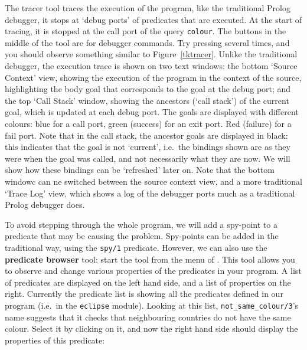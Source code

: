 The tracer tool traces the execution of the program, like the traditional
Prolog debugger, it stops at  `debug ports' of predicates that are
executed.
At the start of tracing,
it is stopped at the call port of the query \verb'colour'. The buttons in
the middle of the tool are for debugger commands. Try pressing
 several times, and you should observe something similar to
Figure~\ref{tktracer}. Unlike the traditional debugger, the execution trace
is shown on two text windows: the bottom `Source Context' view, showing the
execution of the program in the context of the source, highlighting the
body goal that corresponds to the goal at the debug port; and the
top `Call Stack' window, showing the ancestors (`call stack') of the
current goal, which is updated at each debug port. The goals are
displayed with different colours: blue for a call port, green (success) for
an exit port. Red (failure) for a fail port. Note that in the call
stack, the ancestor goals are displayed in black: this indicates that the
goal is not `current', i.e.\ the bindings shown are as they were when the
goal was called, and not necessarily what they are now. We will show how
these bindings can be `refreshed' later on. Note that the bottom windowc
can ne switched between the source context view, and a more traditional
`Trace Log' view, which shows a log of the debugger ports much as a traditional Prolog debugger does.

To avoid stepping through the whole program, we will add a spy-point to a
predicate that may be causing the problem. Spy-points can be added in the
traditional way, using the \verb'spy/1' predicate. However, we can also use
the {\bf predicate browser} tool:  start the  tool
from the  menu of {\tkeclipse}. This tool allows you to observe
and change various properties of the predicates in your program.
A list of predicates are displayed
on the left hand side, and a list of properties on the right.
Currently the predicate list is showing all the predicates defined in our program (i.e.\ in
the \verb'eclipse' module). Looking at this list,
\verb'not_same_colour/3''s name suggests that
it checks that neighbouring countries do not have the same colour.
Select it by clicking on it, and now the right
hand side should display the properties of this predicate:

